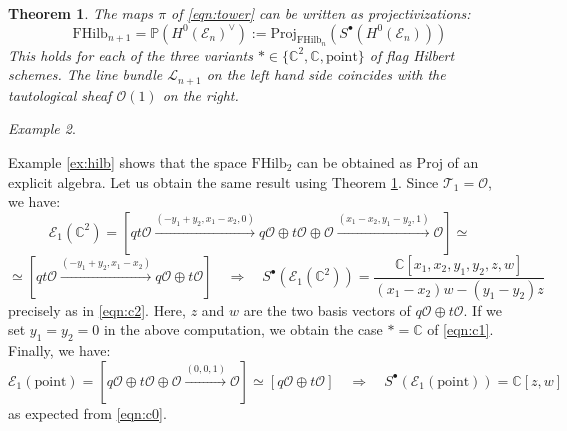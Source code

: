 \documentclass[12pt]{amsart}
\numberwithin{equation}{section}
\newtheorem{theorem}{Theorem}[section]
\theoremstyle{definition}
\theoremstyle{remark}
\newtheorem{example}[theorem]{Example}
\newcommand{\CC}{\mathbb{C}}
\newcommand{\PP}{\mathbb{P}}
\newcommand{\CE}{\mathcal{E}}
\newcommand{\CL}{\mathcal{L}}
\newcommand{\CO}{\mathcal{O}}
\newcommand{\CT}{\mathcal{T}}
\renewcommand{\1}{\mathbf{1}}
\newcommand{\FH}{\mathrm{FHilb}}
\newcommand{\point}{\mathrm{point}}
\newcommand{\proj}{\mathrm{Proj}}
\renewcommand{\star}{* \in \{\CC^2, \CC, \point\}}
\begin{document}
\begin{theorem}
\label{thm:complex}
The maps $\pi$ of \eqref{eqn:tower} can be written as projectivizations:
\begin{equation}
\label{eqn:towers}
\FH_{n+1} = \PP \left( H^0(\CE_n)^{\vee} \right) := \proj_{\FH_n}\left(S^{\bullet} \left( H^0(\CE_n) \right) \right)
\end{equation}
This holds for each of the three variants $\star$ of flag Hilbert schemes. The line bundle $\CL_{n+1}$ on the left hand side coincides with the tautological sheaf $\CO(1)$ on the right. 
\end{theorem}

\begin{example}
\label{n=1}

Example \ref{ex:hilb} shows that the space $\FH_2$ can be obtained as $\proj$ of an explicit algebra. Let us obtain the same result using Theorem \ref{thm:complex}. Since $\CT_1=\CO$, we have:
$$
\CE_1(\CC^2) = \left[qt \CO\xrightarrow{(-y_1+y_2,x_1-x_2,0)} q\CO \oplus t\CO\oplus\CO\xrightarrow{(x_1-x_2,y_1-y_2,1)}\CO\right]\simeq
$$
$$
\simeq \left[qt \CO\xrightarrow{(-y_1+y_2,x_1-x_2)}q\CO\oplus t\CO\right] \quad \Rightarrow \quad S^\bullet \left(\CE_1 (\CC^2)\right) = \frac{\CC[x_1,x_2,y_1,y_2,z,w]}{(x_1-x_2)w-(y_1-y_2)z}
$$
precisely as in \eqref{eqn:c2}. Here, $z$ and $w$ are the two basis vectors of $q \CO \oplus t \CO$. If we set $y_1 = y_2 = 0$ in the above computation, we obtain the case $* = \CC$ of \eqref{eqn:c1}. Finally, we have:
$$
\CE_1(\point) =\left[q\CO\oplus t\CO\oplus\CO\xrightarrow{(0,0,1)}\CO\right]\simeq \left[q \CO\oplus t \CO\right] \quad \Rightarrow \quad S^\bullet \left( \CE_1(\point) \right) = \CC[z,w]
$$
as expected from \eqref{eqn:c0}.
\end{example}
\end{document}
